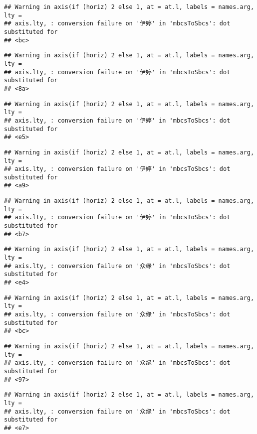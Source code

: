\documentclass[
]{article}
\begin{document}
\begin{verbatim}
## Warning in axis(if (horiz) 2 else 1, at = at.l, labels = names.arg, lty =
## axis.lty, : conversion failure on '伊婷' in 'mbcsToSbcs': dot substituted for
## <bc>
\end{verbatim}

\begin{verbatim}
## Warning in axis(if (horiz) 2 else 1, at = at.l, labels = names.arg, lty =
## axis.lty, : conversion failure on '伊婷' in 'mbcsToSbcs': dot substituted for
## <8a>
\end{verbatim}

\begin{verbatim}
## Warning in axis(if (horiz) 2 else 1, at = at.l, labels = names.arg, lty =
## axis.lty, : conversion failure on '伊婷' in 'mbcsToSbcs': dot substituted for
## <e5>
\end{verbatim}

\begin{verbatim}
## Warning in axis(if (horiz) 2 else 1, at = at.l, labels = names.arg, lty =
## axis.lty, : conversion failure on '伊婷' in 'mbcsToSbcs': dot substituted for
## <a9>
\end{verbatim}

\begin{verbatim}
## Warning in axis(if (horiz) 2 else 1, at = at.l, labels = names.arg, lty =
## axis.lty, : conversion failure on '伊婷' in 'mbcsToSbcs': dot substituted for
## <b7>
\end{verbatim}

\begin{verbatim}
## Warning in axis(if (horiz) 2 else 1, at = at.l, labels = names.arg, lty =
## axis.lty, : conversion failure on '众缘' in 'mbcsToSbcs': dot substituted for
## <e4>
\end{verbatim}

\begin{verbatim}
## Warning in axis(if (horiz) 2 else 1, at = at.l, labels = names.arg, lty =
## axis.lty, : conversion failure on '众缘' in 'mbcsToSbcs': dot substituted for
## <bc>
\end{verbatim}

\begin{verbatim}
## Warning in axis(if (horiz) 2 else 1, at = at.l, labels = names.arg, lty =
## axis.lty, : conversion failure on '众缘' in 'mbcsToSbcs': dot substituted for
## <97>
\end{verbatim}

\begin{verbatim}
## Warning in axis(if (horiz) 2 else 1, at = at.l, labels = names.arg, lty =
## axis.lty, : conversion failure on '众缘' in 'mbcsToSbcs': dot substituted for
## <e7>
\end{verbatim}
\end{document}

